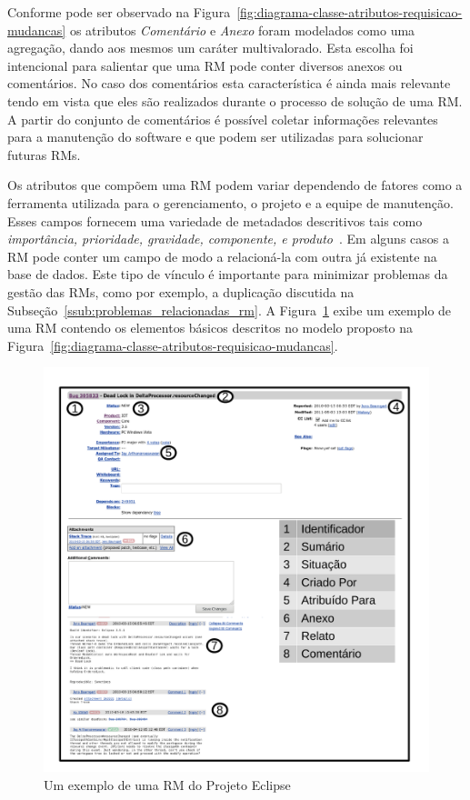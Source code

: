 Conforme pode ser observado na
Figura~\ref{fig:diagrama-classe-atributos-requisicao-mudancas} os atributos
\textit{Comentário} e \textit{Anexo} foram modelados como uma agregação, dando
aos mesmos um caráter multivalorado. Esta escolha foi intencional para salientar
que uma RM pode conter diversos anexos ou comentários. No caso dos comentários
esta característica é ainda mais relevante tendo em vista que eles são
realizados durante o processo de solução de uma RM\@. A partir do conjunto de
comentários é possível coletar informações relevantes para a manutenção do
software e que podem ser utilizadas para solucionar futuras RMs.

Os atributos que compõem uma RM podem variar dependendo de fatores como a
ferramenta utilizada para o gerenciamento, o projeto e a equipe de manutenção.
Esses campos fornecem uma variedade de metadados descritivos tais como
\textit{importância, prioridade, gravidade, componente, e
    produto}~\cite{zhang2016literature}. Em alguns casos a RM pode conter um
campo de modo a relacioná-la com outra já existente na base de dados. Este tipo
de vínculo é importante para minimizar problemas da gestão das RMs, como por
exemplo, a duplicação discutida na
Subseção~\ref{ssub:problemas_relacionadas_rm}. A Figura~\ref{fig:rm-exemplo}
exibe um exemplo de uma RM contendo os elementos básicos descritos no modelo
proposto na Figura~\ref{fig:diagrama-classe-atributos-requisicao-mudancas}.

\begin{figure}[htpb]
	\centering
	\includegraphics[width=0.9\linewidth]{./chapter-manutencao-software-visao-geral/img/rm-exemplo.pdf}
	\caption{Um exemplo de uma RM do Projeto Eclipse}\label{fig:rm-exemplo}
\end{figure}

